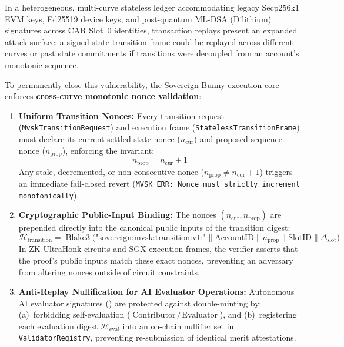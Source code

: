 \documentclass[a4paper,11pt,twoside,parskip=half-,headings=small]{scrartcl}
\newcommand{\code}[1]{\texttt{#1}}
\begin{document}
In a heterogeneous, multi-curve stateless ledger accommodating legacy Secp256k1 EVM keys, Ed25519 device keys, and post-quantum ML-DSA (Dilithium) signatures across CAR Slot~0 identities, transaction replays present an expanded attack surface: a signed state-transition frame could be replayed across different curves or past state commitments if transitions were decoupled from an account's monotonic sequence.

To permanently close this vulnerability, the Sovereign Bunny execution core enforces \textbf{cross-curve monotonic nonce validation}:
\begin{enumerate}
  \item \textbf{Uniform Transition Nonces:} Every transition request (\code{MvskTransitionRequest}) and execution frame (\code{StatelessTransitionFrame}) must declare its current settled state nonce ($n_{\text{cur}}$) and proposed sequence nonce ($n_{\text{prop}}$), enforcing the invariant:
  \begin{equation}
    n_{\text{prop}} = n_{\text{cur}} + 1
  \end{equation}
  Any stale, decremented, or non-consecutive nonce ($n_{\text{prop}} \neq n_{\text{cur}} + 1$) triggers an immediate fail-closed revert (\code{MVSK\_ERR: Nonce must strictly increment monotonically}).
  \item \textbf{Cryptographic Public-Input Binding:} The nonces $(n_{\text{cur}}, n_{\text{prop}})$ are prepended directly into the canonical public inputs of the transition digest:
  \begin{equation}
    \mathcal{H}_{\text{transition}} = \operatorname{Blake3}\bigl(\text{"sovereign:mvsk:transition:v1:"} \parallel \text{AccountID} \parallel n_{\text{prop}} \parallel \text{SlotID} \parallel \Delta_{\text{slot}}\bigr)
  \end{equation}
  In ZK UltraHonk circuits and SGX execution frames, the verifier asserts that the proof's public inputs match these exact nonces, preventing an adversary from altering nonces outside of circuit constraints.
  \item \textbf{Anti-Replay Nullification for AI Evaluator Operations:} Autonomous AI evaluator signatures () are protected against double-minting by: (a)~forbidding self-evaluation ($\text{Contributor} \neq \text{Evaluator}$), and (b)~registering each evaluation digest $\mathcal{H}_{\text{eval}}$ into an on-chain nullifier set in \code{ValidatorRegistry}, preventing re-submission of identical merit attestations.
\end{enumerate}
\end{document}
